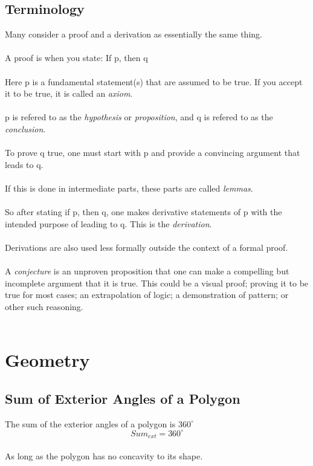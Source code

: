 \documentclass[11pt]{book}
\begin{document}
\section*{Terminology}
Many consider a proof and a derivation as essentially the same thing.\\
\\
A proof is when you state: If p, then q\\
\\
Here p is a fundamental statement(s) that are assumed to be true.  If you accept it to be true, it is called an \emph{axiom}.\\
\\
p is refered to as the \emph{hypothesis} or \emph{proposition}, and q is refered to as the \emph{conclusion}.\\
\\
To prove q true, one must start with p and provide a convincing argument that leads to q.\\
\\
If this is done in intermediate parts, these parts are called \emph{lemmas}.\\
\\
So after stating if p, then q, one makes derivative statements of p with the intended purpose of leading to q.  This is the \emph{derivation}.\\
\\
Derivations are also used less formally outside the context of a formal proof.\\
\\
A \emph{conjecture} is an unproven proposition that one can make a compelling but incomplete argument that it is true.  This could be a visual proof; proving it to be true for most cases; an extrapolation of logic; a demonstration of pattern; or other such reasoning.\\
\\
 
\chapter{Geometry}

\section{Sum of Exterior Angles of a Polygon}

The sum of the exterior angles of a polygon is \(360^{\circ}\)
\[Sum_{ext} = 360^{\circ}\]
\\
As long as the polygon has no concavity to its shape.
\end{document}
